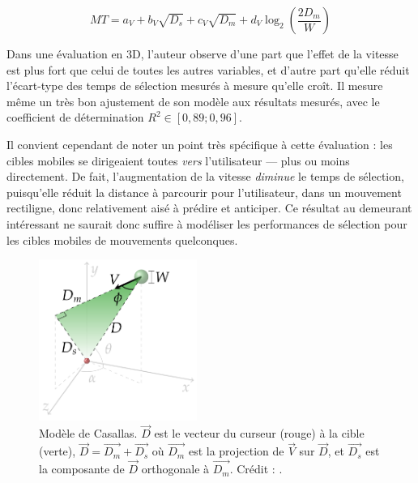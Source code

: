 	\begin{equation}
		\label{eq:casallas}
		MT = a_{V} + b_{V}\sqrt{D_{s}} +  c_{V}\sqrt{D_{m}} + d_{V} \log_{2} \left( \frac{2D_{m}}{W} \right)
	\end{equation}
	
	Dans une évaluation en 3D, l'auteur observe d'une part que l'effet de la vitesse est plus fort que celui de toutes les autres variables, et d'autre part qu'elle réduit l'écart-type des temps de sélection mesurés à mesure qu'elle croît. Il mesure même un très bon ajustement de son modèle aux résultats mesurés, avec le coefficient de détermination $R^{2} \in [0,89 ; 0,96]$.
	
	Il convient cependant de noter un point très spécifique à cette évaluation : les cibles mobiles se dirigeaient toutes \emph{vers} l'utilisateur --- plus ou moins directement. De fait, l'augmentation de la vitesse \emph{diminue} le temps de sélection, puisqu'elle réduit la distance à parcourir pour l'utilisateur, dans un mouvement rectiligne, donc relativement aisé à prédire et anticiper. Ce résultat au demeurant intéressant ne saurait donc suffire à modéliser les performances de sélection pour les cibles mobiles de mouvements quelconques.
	
	\begin{figure} %
		\centering
		\includegraphics[width=0.46\textwidth]{figures/ch2/casallas}
		\caption[Paramètres du modèle de Casallas]{Modèle de Casallas. $\vec{D}$ est le vecteur du curseur (rouge) à la cible (verte), $\vec{D} = \vec{D_{m}} + \vec{D_{s}}$ où $\vec{D_{m}}$ est la projection de $\vec{V}$ sur $\vec{D}$, et $\vec{D_{s}}$ est la composante de $\vec{D}$ orthogonale à $\vec{D_{m}}$. Crédit : \cite{casallas2015prediction}.}
		\label{fig:casallas}
	\end{figure}
	

